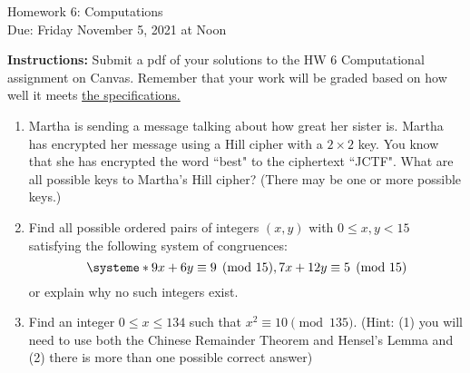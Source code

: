 \documentclass[10pt,a4paper]{article}
\begin{document}
\begin{center}
{\Large Homework 6: Computations}\\
Due: Friday November 5, 2021 at Noon\\


\end{center}
{\bf Instructions:} Submit a pdf of your solutions to the HW 6 Computational assignment on Canvas. Remember that your work will be graded based on how well it meets \href{https://docs.google.com/document/d/1emM06_WRh_h941rsjtRE9fRVndJtfRKd9gyS3Fs_rFA/edit?usp=sharing}{the specifications. }


\begin{enumerate}
\item Martha is sending a message talking about how great her sister is.  Martha has encrypted her message using a Hill cipher with a $2\times 2$ key.  You know that she has encrypted the word ``best" to the ciphertext ``JCTF".  What are all possible keys to Martha's Hill cipher? (There may be one or more possible keys.)

\item Find all possible ordered pairs of integers $(x,y)$ with $0\le x,y<15$ satisfying the following system of congruences:
$$\systeme*{9x+6y\equiv 9\pmod{15}, 7x+12y\equiv 5\pmod{15}}$$ or explain why no such integers exist. 
   
\item Find an integer $0\le x\le 134$ such that $x^2\equiv 10\pmod{135}$. (Hint: (1) you will need to use both the Chinese Remainder Theorem and Hensel's Lemma and (2) there is more than one possible correct answer) \\
\end{enumerate}
\end{document}
